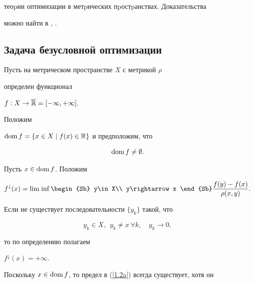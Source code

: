 теоpии оптимизации в метpических пpостpанствах. Доказательства 


можно найти в \cite{vfdcv}, \cite{ddf}.





\subsection{Задача безусловной оптимизации}\label{ss1.1}





Пусть на метрическом пространстве $X$ с метрикой $\rho$


определен функционал


$f: X\rightarrow \overline{\Bbb R}=[-\infty,+\infty]$.


Положим


$\operatorname{dom} f = \{x\in X\mid f(x)\in \Bbb R\}$ и предположим, что


\begin{equation}\label{1.1a}


\dom f \neq\emptyset.


\end{equation}





Пусть $x\in \operatorname{dom} f$. Положим


\begin{equation}\label{1.2a}


f^{\downarrow}(x) = \Liminf \limits \begin{Sb}


y\in X\\ y\rightarrow x \end{Sb} \frac{f(y) -f(x)}{\rho(x,y)}.


\end{equation}








Если не существует последовательности $\{y_k\}$ такой, что


$$


y_k\in X, \ \ y_k\neq x \ \forall k,\quad


y_k\rightarrow 0,


$$


то по определению полагаем


$f^{\downarrow}(x) = +\infty$.


Поскольку $x\in \operatorname{dom} f$, то предел в (\ref{1.2a}) всегда существует, хотя он


